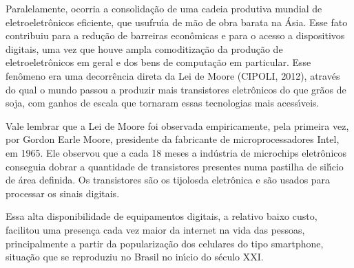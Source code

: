 \documentclass[
12pt,		%
openright,	%
twoside,  %
a4paper,			%
chapter=TITLE,		%
english,			%
french,				%
spanish,			%
brazil				%
]{USPSC-classe/USPSC}
\begin{document}
Paralelamente, ocorria a consolida\c{c}\~ao de uma cadeia produtiva mundial de eletroeletr\^onicos eficiente, que usufru\'{\i}a de m\~ao de obra barata na \'Asia. Esse fato contribuiu para a redu\c{c}\~ao de barreiras econ\^omicas e para o acesso a dispositivos digitais, uma vez que houve ampla comoditiza\c{c}\~ao da produ\c{c}\~ao de eletroeletr\^onicos em geral e dos bens de computa\c{c}\~ao em particular. Esse fen\^omeno era uma decorr\^encia direta da Lei de Moore (CIPOLI, 2012), atrav\'es do qual o mundo passou a produzir mais transistores eletr\^onicos do que gr\~aos de soja, com ganhos de escala que tornaram essas tecnologias mais acess\'{\i}veis.

















Vale lembrar que a Lei de Moore foi observada empiricamente, pela primeira vez, por Gordon Earle Moore, presidente da fabricante de microprocessadores Intel, em 1965. Ele observou que a cada 18 meses a ind\'ustria de microchips eletr\^onicos conseguia dobrar a quantidade de transistores presentes numa pastilha de sil\'{\i}cio de \'area definida. Os transistores s\~ao os \textquotedbl tijolos\textquotedbl  da eletr\^onica e s\~ao usados para processar os sinais digitais.

















Essa alta disponibilidade de equipamentos digitais, a relativo baixo custo, facilitou uma presen\c{c}a cada vez maior da internet na vida das pessoas, principalmente a partir da populariza\c{c}\~ao dos celulares do tipo \textquotedbl smartphone\textquotedbl , situa\c{c}\~ao que se reproduziu no Brasil no in\'{\i}cio do s\'eculo XXI.
\end{document}

